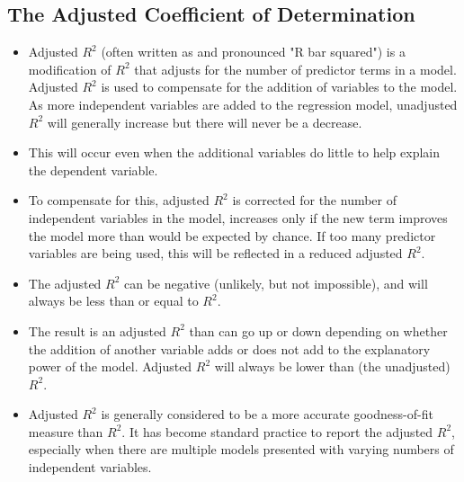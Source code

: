 \documentclass[]{report}
\begin{document}
\subsection*{The Adjusted Coefficient of Determination}
\begin{itemize}
	\item Adjusted $R^2$ (often written as and pronounced "R bar squared") is a modification of $R^2$ that
	adjusts for the number of predictor terms in a model. Adjusted $R^2$ is used to compensate
	for the addition of variables to the model. As more independent variables are added to the
	regression model, unadjusted $R^2$ will generally increase but there will never be a decrease.
\item This
	will occur even when the additional variables do little to help explain the dependent variable.
\item To compensate for this, adjusted $R^2$ is corrected for the number of independent variables in
	the model, increases only if the new term improves the model more than would be expected
	by chance. If too many predictor variables are being used, this will be reflected in a reduced adjusted $R^2$. 
	\item The adjusted $R^2$ can be negative (unlikely, but not impossible), and will always be less than or equal to $R^2$.
\item The result is an adjusted $R^2$ than can go up or down depending on whether the addition of
	another variable adds or does not add to the explanatory power of the model. Adjusted $R^2$ will
	always be lower than (the unadjusted) $R^2$.
\item Adjusted $R^2$ is generally considered to be a more accurate goodness-of-fit measure
	than $R^2$. It has become standard practice to report the adjusted $R^2$, especially when
	there are multiple models presented with varying numbers of independent variables. 
\end{itemize}
\end{document}
